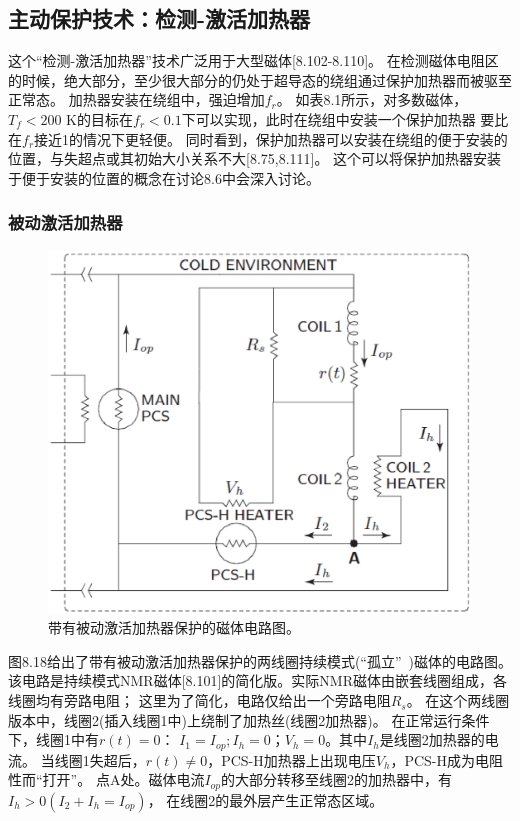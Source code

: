 \subsection{主动保护技术：检测-激活加热器}
这个“检测-激活加热器”技术广泛用于大型磁体[8.102-8.110]。
在检测磁体电阻区的时候，绝大部分，至少很大部分的仍处于超导态的绕组通过保护加热器而被驱至正常态。
加热器安装在绕组中，强迫增加$f_r$。
如表8.1所示，对多数磁体，$T_f<200$ K的目标在$f_r<0.1$下可以实现，此时在绕组中安装一个保护加热器
要比在$f_r$接近1的情况下更轻便。
同时看到，保护加热器可以安装在绕组的便于安装的位置，与失超点或其初始大小关系不大[8.75,8.111]。
这个可以将保护加热器安装于便于安装的位置的概念在讨论8.6中会深入讨论。

\subsubsection*{被动激活加热器}
\begin{figure}
	\centering
	\includegraphics[scale=0.5]{chpt8/figs/fig8.18.eps}
	\caption{带有被动激活加热器保护的磁体电路图。}
\end{figure}

图8.18给出了带有被动激活加热器保护的两线圈持续模式(“孤立”~)磁体的电路图。
该电路是持续模式NMR磁体[8.101]的简化版。实际NMR磁体由嵌套线圈组成，各线圈均有旁路电阻；
这里为了简化，电路仅给出一个旁路电阻$R_s$。
在这个两线圈版本中，线圈2(插入线圈1中)上绕制了加热丝(线圈2加热器)。
在正常运行条件下，线圈1中有$r(t)=0$：
$I_1=I_{op};I_h=0；V_h=0$。其中$I_h$是线圈2加热器的电流。
当线圈1失超后，$r(t)\neq 0$，PCS-H加热器上出现电压$V_h$，PCS-H成为电阻性而“打开”。
点A处。磁体电流$I_{op}$的大部分转移至线圈2的加热器中，有$I_h>0(I_2+I_h=I_{op})$，
在线圈2的最外层产生正常态区域。

